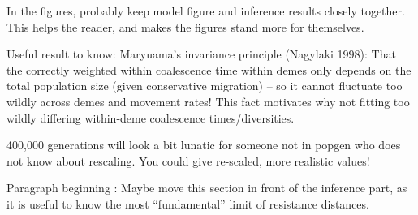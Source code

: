 \begin{point}{}
    In the figures, probably keep model figure and inference results closely
    together. This helps the reader, and makes the figures stand more for
    themselves.
\end{point}


\begin{point}{}
    Useful result to know: Maryuama’s invariance principle (Nagylaki 1998):
    That the correctly weighted within coalescence time within demes only
    depends on the total population size  (given conservative migration) -- so
    it cannot fluctuate too wildly across demes and movement rates! This fact
    motivates why not fitting too wildly differing within-deme coalescence
    times/diversities.
\end{point}


\begin{point}{\revref}
    400,000 generations will look a bit lunatic for someone not in
    popgen who does not know about rescaling. You could give re-scaled, more
    realistic values!
\end{point}


\begin{point}{Paragraph beginning \revref:}
    Maybe move this section in front of the inference part, as it is useful to
    know the most ``fundamental'' limit of resistance distances.
\end{point}

